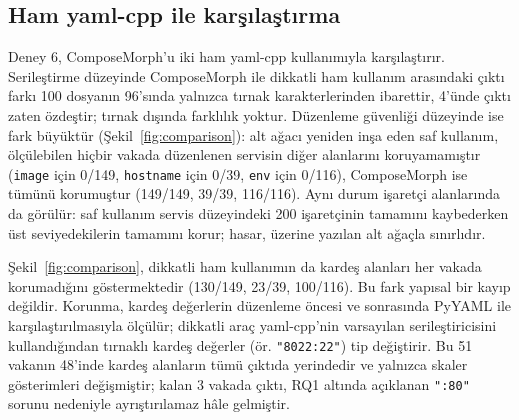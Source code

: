 \documentclass[12pt,a4paper]{article}
\begin{document}
\subsection{Ham yaml-cpp ile karşılaştırma}
Deney 6, ComposeMorph'u iki ham yaml-cpp kullanımıyla karşılaştırır.
Serileştirme düzeyinde ComposeMorph ile dikkatli ham kullanım arasındaki
çıktı farkı 100 dosyanın 96'sında yalnızca tırnak karakterlerinden
ibarettir, 4'ünde çıktı zaten özdeştir; tırnak dışında farklılık yoktur.
Düzenleme güvenliği düzeyinde ise fark büyüktür (Şekil~\ref{fig:comparison}):
alt ağacı yeniden inşa eden saf kullanım, ölçülebilen hiçbir vakada
düzenlenen servisin diğer alanlarını koruyamamıştır (\texttt{image} için 0/149, \texttt{hostname}
için 0/39, \texttt{env} için 0/116), ComposeMorph ise tümünü korumuştur
(149/149, 39/39, 116/116). Aynı durum işaretçi alanlarında da görülür:
saf kullanım servis düzeyindeki 200 işaretçinin tamamını kaybederken üst
seviyedekilerin tamamını korur; hasar, üzerine yazılan alt ağaçla sınırlıdır.

Şekil~\ref{fig:comparison}, dikkatli ham kullanımın da kardeş alanları
her vakada korumadığını göstermektedir (130/149, 23/39, 100/116). Bu fark
yapısal bir kayıp değildir. Korunma, kardeş değerlerin düzenleme öncesi ve
sonrasında PyYAML ile karşılaştırılmasıyla ölçülür; dikkatli araç
yaml-cpp'nin varsayılan serileştiricisini kullandığından tırnaklı kardeş
değerler (ör. \texttt{"8022:22"}) tip değiştirir. Bu 51 vakanın 48'inde
kardeş alanların tümü çıktıda yerindedir ve yalnızca skaler gösterimleri
değişmiştir; kalan 3 vakada çıktı, RQ1 altında açıklanan \texttt{":80"}
sorunu nedeniyle ayrıştırılamaz hâle gelmiştir.
\end{document}
